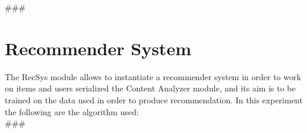 
\usepackage{comment}

###
\section{Recommender System}\label{sec:recsys}
The RecSys module allows to instantiate a recommender system in order to work on items and users serialized
the Content Analyzer module, and its aim is to be trained on the data used in order to produce recommendation.
In this experiment the following are the algorithm used: \\

###


\begin{comment}
Author = DIEGO MICCOLI
Alias = Kozen88
Organization = SWAP Research Group UniBa
Date = 27-12-2023

This mini template is not working by itself because there are latex command missing needed
to compile the file and give as output a pdf file, in addition it has been added jinja
statement in order to control the rendering of the latex file with the jinja library, for these
reasons it needs to be used with the other mini chunks in conjunction.
\end{comment}